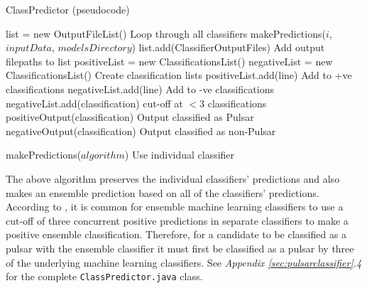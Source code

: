 \documentclass{article}
\begin{document}
\begin{appendices}
\begin{subappendices}
\begin{algorithm}[H]
    \caption{ClassPredictor (pseudocode)}
    \begin{algorithmic}[1]
            \State list = new OutputFileList()
                \Comment Loop through all classifiers
                \State makePredictions($i$, $inputData$, $modelsDirectory$)
                \State list.add(ClassifierOutputFiles)
                \Comment Add output filepaths to list
            \EndFor
            \State positiveList = new ClassificationsList()
            \State negativeList = new ClassificationsList()
            \Comment Create classification lists
                        \State positiveList.add(line)
                        \Comment Add to +ve classifications
                    \EndFor
                        \State negativeList.add(line)
                        \Comment Add to -ve classifications
                    \EndFor
                \EndIf
            \EndFor
                    \State negativeList.add(classification)
                    \Comment cut-off at $< 3$ classifications
                \Else
                    \State positiveOutput(classification)
                    \Comment Output classified as Pulsar
                \EndIf
            \EndFor
                \State negativeOutput(classification)
                \Comment Output classified as non-Pulsar
            \EndFor

        \Else 
            \State makePredictions($algorithm$)
            \Comment Use individual classifier
        \EndIf
        
    \end{algorithmic}
\end{algorithm}

The above algorithm preserves the individual classifiers' predictions and also makes an ensemble prediction based on all of the classifiers' predictions. According to \cite{tan}, it is common for ensemble machine learning classifiers to use a cut-off of three concurrent positive predictions in separate classifiers to make a positive ensemble classification. Therefore, for a candidate to be classified as a pulsar with the ensemble classifier it must first be classified as a pulsar by three of the underlying machine learning classifiers. See \emph{Appendix \ref{sec:pulsarclassifier}.4} for the complete \verb|ClassPredictor.java| class.


\end{subappendices}
\end{appendices}
\end{document}
